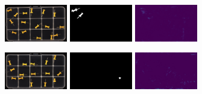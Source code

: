 \begin{figure}[H]
    \begin{subfigure}[b]{\textwidth}
        \centering
        \begin{minipage}{0.45\textwidth}
            \centering
            \includegraphics[width=0.3\textwidth]{figures/appendix/appendix_DRAEM/PP/l010.png}
            \includegraphics[width=0.3\textwidth]{figures/appendix/appendix_DRAEM/PP/10_m.png}
            \includegraphics[width=0.3\textwidth]{figures/appendix/appendix_DRAEM/PP/logical10.png}
        \end{minipage}
        \begin{minipage}{0.45\textwidth}
            \centering
            \includegraphics[width=0.3\textwidth]{figures/appendix/appendix_DRAEM/PP/s010.png}
            \includegraphics[width=0.3\textwidth]{figures/appendix/appendix_DRAEM/PP/s10m.png}
            \includegraphics[width=0.3\textwidth]{figures/appendix/appendix_DRAEM/PP/structural10_mask.png}
        \end{minipage}
    \end{subfigure}


\end{figure}
